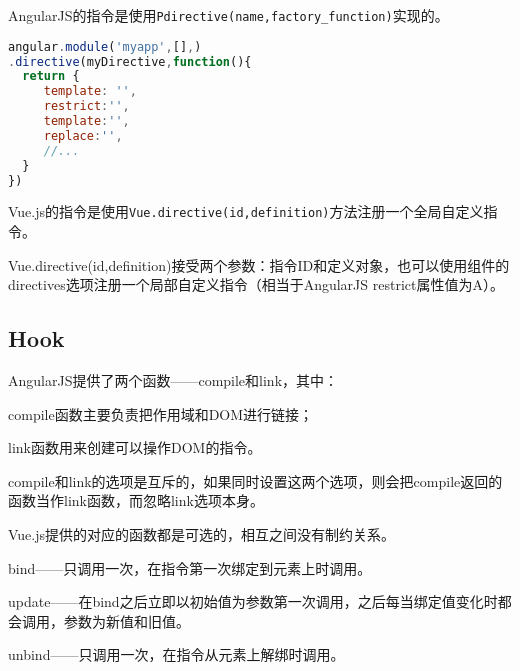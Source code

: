 \begin{compactitem}
\item AngularJS的指令是使用\texttt{Pdirective(name,factory\_function)}实现的。



\begin{lstlisting}[language=JavaScript]
angular.module('myapp',[],)
.directive(myDirective,function(){
  return {
     template: '',
     restrict:'',
     template:'',
     replace:'',
     //...
  }
})
\end{lstlisting}

\item Vue.js的指令是使用\texttt{Vue.directive(id,definition)}方法注册一个全局自定义指令。

\end{compactitem}

Vue.directive(id,definition)接受两个参数：指令ID和定义对象，也可以使用组件的directives选项注册一个局部自定义指令（相当于AngularJS restrict属性值为A）。


\subsection{Hook}

AngularJS提供了两个函数——compile和link，其中：

\begin{compactitem}
\item compile函数主要负责把作用域和DOM进行链接；
\item link函数用来创建可以操作DOM的指令。
\end{compactitem}

compile和link的选项是互斥的，如果同时设置这两个选项，则会把compile返回的函数当作link函数，而忽略link选项本身。



Vue.js提供的对应的函数都是可选的，相互之间没有制约关系。

\begin{compactitem}
\item bind——只调用一次，在指令第一次绑定到元素上时调用。


\item update——在bind之后立即以初始值为参数第一次调用，之后每当绑定值变化时都会调用，参数为新值和旧值。


\item unbind——只调用一次，在指令从元素上解绑时调用。

\end{compactitem}



